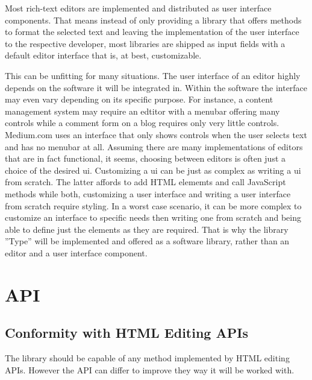 Most rich-text editors are implemented and distributed as user interface components. That means instead of only providing a library that offers methods to format the selected text and leaving the implementation of the user interface to the respective developer, most libraries are shipped as input fields with a default editor interface that is, at best, customizable.

This can be unfitting for many situations. The user interface of an editor highly depends on the software it will be integrated in. Within the software the interface may even vary depending on its specific purpose. For instance, a content management system may require an edtitor with a menubar offering many controls while a comment form on a blog requires only very little controls. Medium.com uses an interface that only shows controls when the user selects text and has no menubar at all. Assuming there are many implementations of editors that are in fact functional, it seems, choosing between editors is often just a choice of the desired ui. Customizing a ui can be just as complex as writing a ui from scratch. The latter affords to add HTML elememts and call JavaScript methods while both, customizing a user interface and writing a user interface from scratch require styling. In a worst case scenario, it can be more complex to customize an interface to specific needs then writing one from scratch and being able to define just the elements as they are required. That is why the library ''Type'' will be implemented and offered as a software library, rather than an editor and a user interface component.



\section{API}
\label{sec:api_design}
\label{sec:las_before_software_architecture}

\subsection{Conformity with HTML Editing APIs}

The library should be capable of any method implemented by HTML editing APIs. However the API can differ to improve they way it will be worked with.

